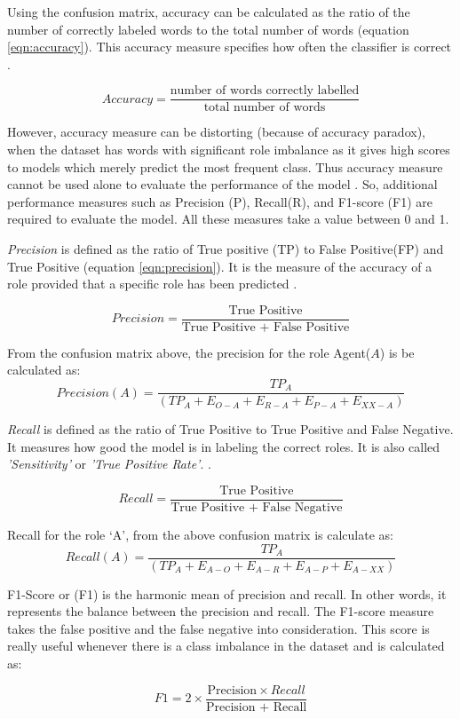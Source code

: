Using the confusion matrix, accuracy can be calculated as the ratio of the number of correctly labeled words to the total number of words (equation \ref{eqn:accuracy}). This accuracy measure specifies how often the classifier is correct \cite{classification_scores:2009}. 

\begin{equation}\label{eqn:accuracy}
Accuracy = \frac{\text{number of words correctly labelled}}{\text{total number of words}}
\end{equation}
 
However, accuracy measure can be distorting (because of accuracy paradox), when the dataset has words with significant role imbalance as it gives high scores to models which merely predict the most frequent class. Thus accuracy measure cannot be used alone to evaluate the performance of the model \cite{accuracy_paradox_1:2008, accuracy_paradox_2:2014}. So, additional performance measures such as Precision (P), Recall(R), and F1-score (F1) are required to evaluate the model. All these measures take a value between 0 and 1. 

\textit{Precision} is defined as the ratio of True positive (TP) to False Positive(FP) and True Positive (equation \ref{eqn:precision}). It is the measure of the accuracy of a role provided that a specific role has been predicted \cite{classification_scores:2009}.

\begin{equation}\label{eqn:precision}
Precision = \frac{\text{True Positive}}{\text{True Positive + False Positive}}
\end{equation}

From the confusion matrix above, the precision for the role Agent($A$) is be calculated as:
\[Precision(A) = \frac{TP_{A}}{(TP_{A}+E_{O-A}+E_{R-A}+E_{P-A}+E_{XX-A})}\]

\noindent \textit{Recall} is defined as the ratio of True Positive to True Positive and False Negative. It measures how good the model is in labeling the correct roles. It is also called \textit{'Sensitivity'} or \textit{'True Positive Rate'}. \cite{classification_scores:2009}.

\begin{equation}\label{eqn:recall}
Recall = \frac{\text{True Positive}}{\text{True Positive + False Negative}}
\end{equation}

Recall for the role `A', from the above confusion matrix is calculate as:
\[Recall(A) = \frac{TP_{A}}{(TP_{A}+E_{A-O}+E_{A-R}+E_{A-P}+E_{A-XX})}\]

\noindent F1-Score or (F1) is the harmonic mean of precision and recall. In other words, it represents the balance between the precision and recall. The F1-score measure takes the false positive and the false negative into consideration. This score is really useful whenever there is a class imbalance in the dataset \cite{classification_scores:2009} and is calculated as:

\begin{equation}\label{eqn:precision}
F1 = 2\times \frac{\text{Precision} \times{Recall }}{\text{Precision + Recall}}
\end{equation}

